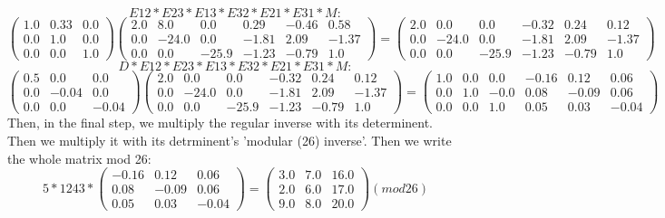 \documentclass{article}%
\begin{document}
\newline%
%
\[%
E12 * E23 * E13 * E32 * E21 * E31 * M:%
\]%
\[%
\begin{pmatrix}%
1.0&0.33&0.0\\%
0.0&1.0&0.0\\%
0.0&0.0&1.0%
\end{pmatrix} \begin{pmatrix}%
2.0&8.0&0.0&0.29&-0.46&0.58\\%
0.0&-24.0&0.0&-1.81&2.09&-1.37\\%
0.0&0.0&-25.9&-1.23&-0.79&1.0%
\end{pmatrix} = \begin{pmatrix}%
2.0&0.0&0.0&-0.32&0.24&0.12\\%
0.0&-24.0&0.0&-1.81&2.09&-1.37\\%
0.0&0.0&-25.9&-1.23&-0.79&1.0%
\end{pmatrix}%
\]%
\newline%
%
\[%
D * E12 * E23 * E13 * E32 * E21 * E31 * M:%
\]%
\[%
\begin{pmatrix}%
0.5&0.0&0.0\\%
0.0&-0.04&0.0\\%
0.0&0.0&-0.04%
\end{pmatrix} \begin{pmatrix}%
2.0&0.0&0.0&-0.32&0.24&0.12\\%
0.0&-24.0&0.0&-1.81&2.09&-1.37\\%
0.0&0.0&-25.9&-1.23&-0.79&1.0%
\end{pmatrix} = \begin{pmatrix}%
1.0&0.0&0.0&-0.16&0.12&0.06\\%
0.0&1.0&-0.0&0.08&-0.09&0.06\\%
0.0&0.0&1.0&0.05&0.03&-0.04%
\end{pmatrix}%
\]%
\newline%
%
Then, in the final step, we multiply the regular inverse with its determinent. Then we multiply it with its detrminent's 'modular (26) inverse'. Then we write the whole matrix mod 26:%
\[%
5 * 1243 *  \begin{pmatrix}%
-0.16&0.12&0.06\\%
0.08&-0.09&0.06\\%
0.05&0.03&-0.04%
\end{pmatrix} = \begin{pmatrix}%
3.0&7.0&16.0\\%
2.0&6.0&17.0\\%
9.0&8.0&20.0%
\end{pmatrix} (mod  26)%
\]%
\newline%
\end{document}
